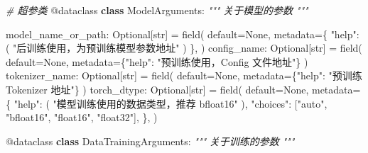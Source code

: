 \documentclass[
]{article}
\newenvironment{Shaded}{}{}
\newcommand{\AttributeTok}[1]{\textcolor[rgb]{0.49,0.56,0.16}{#1}}
\newcommand{\BuiltInTok}[1]{\textcolor[rgb]{0.00,0.50,0.00}{#1}}
\newcommand{\CommentTok}[1]{\textcolor[rgb]{0.38,0.63,0.69}{\textit{#1}}}
\newcommand{\KeywordTok}[1]{\textcolor[rgb]{0.00,0.44,0.13}{\textbf{#1}}}
\newcommand{\NormalTok}[1]{#1}
\newcommand{\OperatorTok}[1]{\textcolor[rgb]{0.40,0.40,0.40}{#1}}
\newcommand{\StringTok}[1]{\textcolor[rgb]{0.25,0.44,0.63}{#1}}
\newcommand{\VariableTok}[1]{\textcolor[rgb]{0.10,0.09,0.49}{#1}}
\begin{document}
\begin{Shaded}
\begin{Highlighting}[]
\CommentTok{\# 超参类}
\AttributeTok{@dataclass}
\KeywordTok{class}\NormalTok{ ModelArguments:}
    \CommentTok{"""}
\CommentTok{    关于模型的参数}
\CommentTok{    """}

\NormalTok{    model\_name\_or\_path: Optional[}\BuiltInTok{str}\NormalTok{] }\OperatorTok{=}\NormalTok{ field(}
\NormalTok{        default}\OperatorTok{=}\VariableTok{None}\NormalTok{,}
\NormalTok{        metadata}\OperatorTok{=}\NormalTok{\{}
            \StringTok{"help"}\NormalTok{: (}
                \StringTok{"后训练使用，为预训练模型参数地址"}
\NormalTok{            )}
\NormalTok{        \},}
\NormalTok{    )}
\NormalTok{    config\_name: Optional[}\BuiltInTok{str}\NormalTok{] }\OperatorTok{=}\NormalTok{ field(}
\NormalTok{        default}\OperatorTok{=}\VariableTok{None}\NormalTok{, metadata}\OperatorTok{=}\NormalTok{\{}\StringTok{"help"}\NormalTok{: }\StringTok{"预训练使用，Config 文件地址"}\NormalTok{\}}
\NormalTok{    )}
\NormalTok{    tokenizer\_name: Optional[}\BuiltInTok{str}\NormalTok{] }\OperatorTok{=}\NormalTok{ field(}
\NormalTok{        default}\OperatorTok{=}\VariableTok{None}\NormalTok{, metadata}\OperatorTok{=}\NormalTok{\{}\StringTok{"help"}\NormalTok{: }\StringTok{"预训练 Tokenizer 地址"}\NormalTok{\}}
\NormalTok{    )}
\NormalTok{    torch\_dtype: Optional[}\BuiltInTok{str}\NormalTok{] }\OperatorTok{=}\NormalTok{ field(}
\NormalTok{        default}\OperatorTok{=}\VariableTok{None}\NormalTok{,}
\NormalTok{        metadata}\OperatorTok{=}\NormalTok{\{}
            \StringTok{"help"}\NormalTok{: (}
                \StringTok{"模型训练使用的数据类型，推荐 bfloat16"}
\NormalTok{            ),}
            \StringTok{"choices"}\NormalTok{: [}\StringTok{"auto"}\NormalTok{, }\StringTok{"bfloat16"}\NormalTok{, }\StringTok{"float16"}\NormalTok{, }\StringTok{"float32"}\NormalTok{],}
\NormalTok{        \},}
\NormalTok{    )}


\AttributeTok{@dataclass}
\KeywordTok{class}\NormalTok{ DataTrainingArguments:}
    \CommentTok{"""}
\CommentTok{    关于训练的参数}
\CommentTok{    """}


\end{Highlighting}
\end{Shaded}
\end{document}
